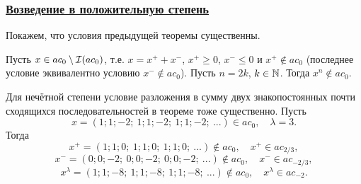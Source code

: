 \begin{frame}\frametitle{\underline{Возведение в положительную степень}}
	Покажем, что условия предыдущей теоремы существенны.

	\begin{llemma}
		\label{thm:ac0_pow_even}
		Пусть $x\in ac_0 \setminus \mathcal{I}(ac_0)$, т.е. $x = x^+ +x^-$, $x^+\geq 0$, $x^- \leq 0$ и $x^+ \notin ac_0$
		(последнее условие эквивалентно условию $x^- \notin ac_0$).
		Пусть $n = 2k$, $k\in\mathbb{N}$.
		Тогда $x^n \notin ac_0$.
	\end{llemma}





	\begin{eexample}
		Для нечётной степени условие разложения в сумму двух знакопостоянных
		почти сходящихся последовательностей в теореме тоже существенно.
		Пусть
		\begin{equation}
			x = (1;1;-2;\ 1;1;-2;\ 1;1;-2;\ ...) \in ac_0
			,
			\quad
			\lambda = 3
			.
		\end{equation}
		Тогда
		\begin{equation}
			x^+ = (1;1;0;\ 1;1;0;\ 1;1;0;\ ...) \notin ac_0, \quad x^+ \in ac_{2/3}
			,
		\end{equation}
		\begin{equation}
			x^- = (0;0;-2;\ 0;0;-2;\ 0;0;-2;\ ...) \notin ac_0, \quad x^- \in ac_{-2/3}
			,
		\end{equation}
		\begin{equation}
			x^\lambda = (1;1;-8;\ 1;1;-8;\ 1;1;-8;\ ...) \notin ac_0, \quad x^\lambda \in ac_{-2}
			.
		\end{equation}
	\end{eexample}



\end{frame}



